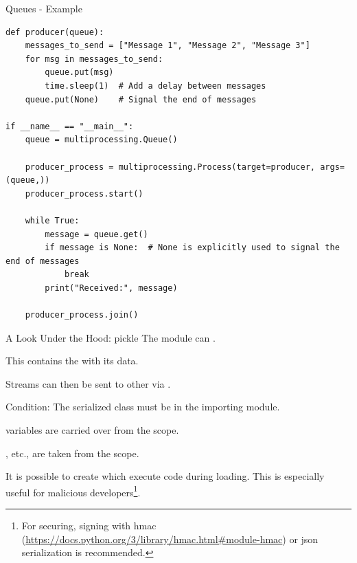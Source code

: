 \documentclass[12pt, aspectratio=169, usepdftitle=false, handout]{beamer}
\newcommand{\pp}[1]{\lpl{#1}}
\begin{document}
\begin{frame}[fragile]{Queues - Example}
	\begin{lstlisting}[language=pytiny]
def producer(queue):
    messages_to_send = ["Message 1", "Message 2", "Message 3"]
    for msg in messages_to_send:
        queue.put(msg)
        time.sleep(1)  # Add a delay between messages
    queue.put(None)    # Signal the end of messages

if __name__ == "__main__":
    queue = multiprocessing.Queue()

    producer_process = multiprocessing.Process(target=producer, args=(queue,))
    producer_process.start()

    while True:
        message = queue.get()
        if message is None:  # None is explicitly used to signal the end of messages
            break
        print("Received:", message)

    producer_process.join()
	\end{lstlisting}
\end{frame}

\begin{frame}[fragile]{A Look Under the Hood: pickle}
        The \pp{pickle} module can .

\pause
\medskip

This contains the  with its data.

\pause
\medskip

Streams can then be sent to other  via \pp{Pipe}.

\pause
\medskip

Condition: The serialized class must be  in the importing module.

\medskip

 variables are carried over from the  scope.

\medskip

, etc., are taken from the  scope.

\pause
\medskip

It is possible to create  which execute  code during loading. This is especially useful for malicious developers\footnote{For securing, signing with hmac (\url{https://docs.python.org/3/library/hmac.html\#module-hmac}) or json serialization is recommended.}.

\end{frame}
\end{document}
